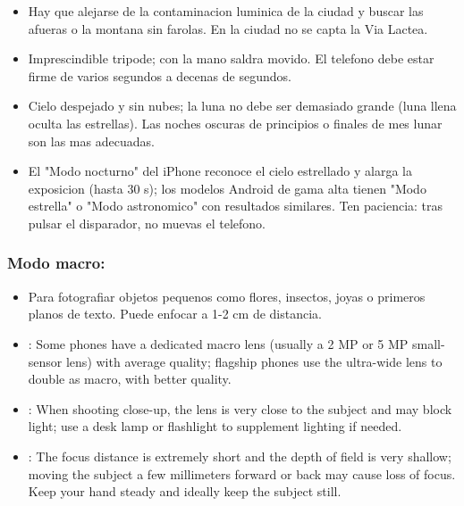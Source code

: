 \begin{itemize}
  \item Hay que alejarse de la contaminacion luminica de la ciudad y buscar las afueras o la montana sin farolas. En la ciudad no se capta la Via Lactea.
  \item Imprescindible tripode; con la mano saldra movido. El telefono debe estar firme de varios segundos a decenas de segundos.
  \item Cielo despejado y sin nubes; la luna no debe ser demasiado grande (luna llena oculta las estrellas). Las noches oscuras de principios o finales de mes lunar son las mas adecuadas.
  \item El "Modo nocturno" del iPhone reconoce el cielo estrellado y alarga la exposicion (hasta 30 s); los modelos Android de gama alta tienen "Modo estrella" o "Modo astronomico" con resultados similares. Ten paciencia: tras pulsar el disparador, no muevas el telefono.
\end{itemize}

\subsubsection*{Modo macro:}

\begin{itemize}
  \item Para fotografiar objetos pequenos como flores, insectos, joyas o primeros planos de texto. Puede enfocar a 1-2 cm de distancia.
  \item : Some phones have a dedicated macro lens (usually a 2 MP or 5 MP small-sensor lens) with average quality; flagship phones use the ultra-wide lens to double as macro, with better quality.
  \item : When shooting close-up, the lens is very close to the subject and may block light; use a desk lamp or flashlight to supplement lighting if needed.
  \item : The focus distance is extremely short and the depth of field is very shallow; moving the subject a few millimeters forward or back may cause loss of focus. Keep your hand steady and ideally keep the subject still.
\end{itemize}

